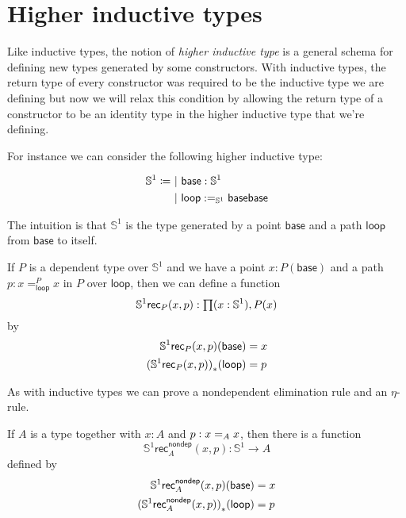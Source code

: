 \newcommand{\Sn}{\mathbb{S}}

\newcommand{\base}{\ensuremath{\mathsf{base}}\xspace}
\newcommand{\lloop}{\ensuremath{\mathsf{loop}}\xspace}
\newcommand{\seg}{\ensuremath{\mathsf{seg}}\xspace}
\newcommand{\eqtopath}{\ensuremath{\mathsf{eqtopath}}\xspace}

\chapter{Higher inductive types}
\label{cha:hits}

Like inductive types, the notion of \emph{higher inductive type} is a general
schema for defining new types generated by some constructors. With inductive
types, the return type of every constructor was required to be the inductive
type we are defining but now we will relax this condition by allowing the return
type of a constructor to be an identity type in the higher inductive type that
we’re defining.

For instance we can consider the following higher inductive type:

\begin{align*}
  \Sn^1 \defeq&\ |\ \base:\Sn^1 \\
  &\ |\ \lloop:\id[\Sn^1]\base\base
\end{align*}

The intuition is that $\Sn^1$ is the type generated by a point \base and a path
\lloop from \base to itself.

If $P$ is a dependent type over $\Sn^1$ and we have a point $x:P(\base)$ and a
path $p:x=^P_\lloop{}x$ in $P$ over $\lloop$, then we can define a function
\[\Sn^1\mathsf{rec}_P(x,p):\prd{x:\Sn^1}P(x)\]
by
\begin{align*}
  \Sn^1\mathsf{rec}_P(x,p)(\base)&=x \\
  \map{(\Sn^1\mathsf{rec}_P(x,p))}{\lloop}&=p
\end{align*}

As with inductive types we can prove a nondependent elimination rule and an
$\eta$-rule.

\begin{lem}
  If $A$ is a type together with $x:A$ and $p:\id[A]xx$, then there is a
  function
  \[\Sn^1\mathsf{rec}^{\mathsf{nondep}}_A(x,p):\Sn^1\to{}A\]
  defined by
  \begin{align*}
    \Sn^1\mathsf{rec}^{\mathsf{nondep}}_A(x,p)(\base)&=x \\
    \map{(\Sn^1\mathsf{rec}^{\mathsf{nondep}}_A(x,p))}{\lloop}&=p
  \end{align*}
\end{lem}

